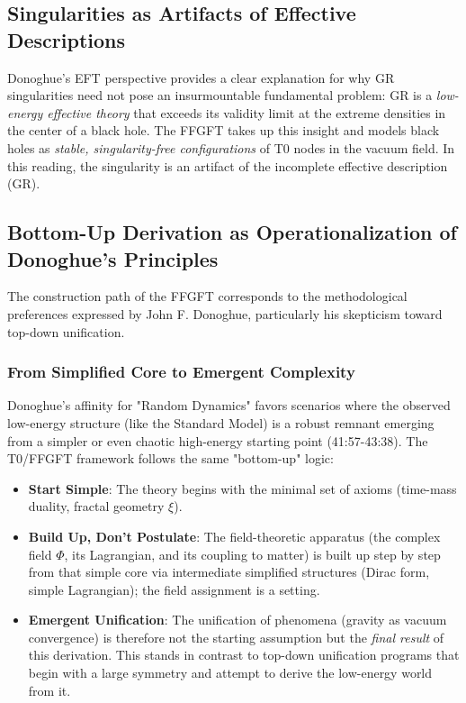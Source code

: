 	\subsection{Singularities as Artifacts of Effective Descriptions}
	
	Donoghue's EFT perspective provides a clear explanation for why GR singularities need not pose an insurmountable fundamental problem: GR is a \emph{low-energy effective theory} that exceeds its validity limit at the extreme densities in the center of a black hole. The FFGFT takes up this insight and models black holes as \emph{stable, singularity-free configurations} of T0 nodes in the vacuum field. In this reading, the singularity is an artifact of the incomplete effective description (GR).
	
	\subsection{Bottom-Up Derivation as Operationalization of Donoghue's Principles}
	
	The construction path of the FFGFT corresponds to the methodological preferences expressed by John F. Donoghue, particularly his skepticism toward top-down unification.
	
	\subsubsection{From Simplified Core to Emergent Complexity}
	Donoghue's affinity for "Random Dynamics" favors scenarios where the observed low-energy structure (like the Standard Model) is a robust remnant emerging from a simpler or even chaotic high-energy starting point \cite{DonoghueInterview2025} (41:57-43:38). The T0/FFGFT framework follows the same "bottom-up" logic:
	\begin{itemize}
		\item \textbf{Start Simple}: The theory begins with the minimal set of axioms (time-mass duality, fractal geometry \(\xi\)).
		\item \textbf{Build Up, Don't Postulate}: The field-theoretic apparatus (the complex field \(\Phi\), its Lagrangian, and its coupling to matter) is built up step by step from that simple core via intermediate simplified structures (Dirac form, simple Lagrangian); the field assignment is a setting.
		\item \textbf{Emergent Unification}: The unification of phenomena (gravity as vacuum convergence) is therefore not the starting assumption but the \emph{final result} of this derivation. This stands in contrast to top-down unification programs that begin with a large symmetry and attempt to derive the low-energy world from it.
	\end{itemize}
	
